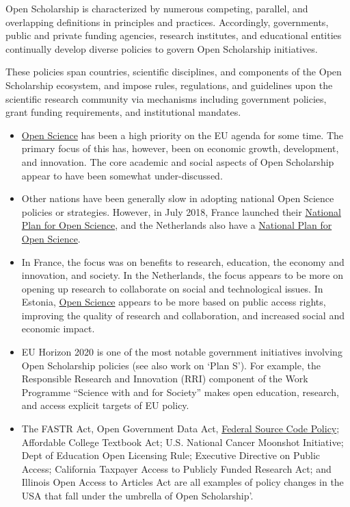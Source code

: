 Open Scholarship is characterized by numerous competing, parallel, and
overlapping definitions in principles and practices. Accordingly,
governments, public and private funding agencies, research institutes,
and educational entities continually develop diverse policies to govern
Open Scholarship initiatives.

These policies span countries, scientific disciplines, and components of
the Open Scholarship ecosystem, and impose rules, regulations, and
guidelines upon the scientific research community via mechanisms
including government policies, grant funding requirements, and
institutional mandates.

\begin{itemize}
\item
  \href{https://ec.europa.eu/research/openscience/index.cfm}{Open
  Science} has been a high priority on the EU agenda for some time. The
  primary focus of this has, however, been on economic growth,
  development, and innovation. The core academic and social aspects of
  Open Scholarship appear to have been somewhat under-discussed.
\item
  Other nations have been generally slow in adopting national Open
  Science policies or strategies. However, in July 2018, France launched
  their
  \href{https://libereurope.eu/wp-content/uploads/2018/07/SO_A4_2018_05-EN_print.pdf}{National
  Plan for Open Science}, and the Netherlands also have a
  \href{https://www.openscience.nl/en/open-science-in-the-netherlands}{National
  Plan for Open Science}.
\item
  In France, the focus was on benefits to research, education, the
  economy and innovation, and society. In the Netherlands, the focus
  appears to be more on opening up research to collaborate on social and
  technological issues. In Estonia,
  \href{http://www.etag.ee/wp-content/uploads/2017/03/Open-Science-in-Estonia-Principles-and-Recommendations-final.pdf}{Open
  Science} appears to be more based on public access rights, improving
  the quality of research and collaboration, and increased social and
  economic impact.
\item
  EU Horizon 2020 is one of the most notable government initiatives
  involving Open Scholarship policies (see also work on `Plan S'). For
  example, the Responsible Research and Innovation (RRI) component of
  the Work Programme ``Science with and for Society'' makes open
  education, research, and access explicit targets of EU policy.
\item
  The FASTR Act, Open Government Data Act,
  \href{https://sourcecode.cio.gov/}{Federal Source Code Policy};
  Affordable College Textbook Act; U.S. National Cancer Moonshot
  Initiative; Dept of Education Open Licensing Rule; Executive Directive
  on Public Access; California Taxpayer Access to Publicly Funded
  Research Act; and Illinois Open Access to Articles Act are all
  examples of policy changes in the USA that fall under the umbrella of
  Open Scholarship'.
\end{itemize}

